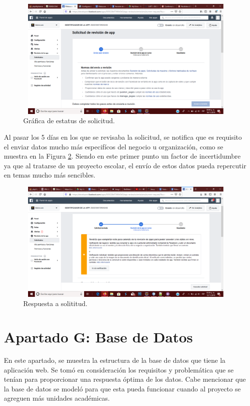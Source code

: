 	\begin{figure}[hbt!]
		\centering
		\includegraphics[width=15cm, height=6cm]{Imagenes/FacebookAPI/Facebook12}
		\caption{Gráfica de estatus de solicitud.}
		\label{creacionFB12}
	\end{figure}
\pagebreak
	\noindent Al pasar los 5 días en los que se revisaba la solicitud, se notifica que es requisito el enviar datos mucho más especifícos del negocio u organización, como se muestra en la Figura \ref{creacionFB16}. Siendo en este primer punto un factor de incertidumbre ya que al tratarse de un proyecto escolar, el envío de estos datos pueda repercutir en temas mucho más sencibles.

	\begin{figure}[hbt!]
		\centering
		\includegraphics[width=15cm, height=6cm]{Imagenes/FacebookAPI/Facebook16}
		\caption{Respuesta a solititud.}
		\label{creacionFB16}
	\end{figure}
	
	
	\chapter{Apartado G: Base de Datos}
	\noindent En este apartado, se muestra la estructura de la base de datos que tiene la aplicación web. Se tomó en consideración los requisitos y problemática que se tenían para proporcionar una respuesta óptima de los datos. Cabe mencionar que la base de datos se modeló para que esta pueda funcionar cuando al proyecto se agreguen más unidades académicas.
	
